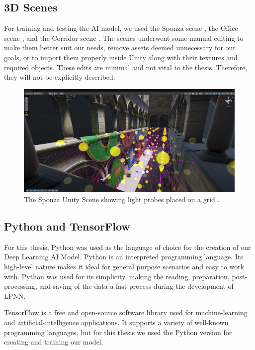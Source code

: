 \subsection{3D Scenes}
For training and testing the AI model, we used the Sponza scene \parencite{Sponza2017}, the Office scene \parencite{Office2021}, and the Corridor scene \parencite{Corridor2021}. The scenes underwent some manual editing to make them better suit our needs, remove assets deemed unnecessary for our goals, or to import them properly inside Unity along with their textures and required objects. These edits are minimal and not vital to the thesis. Therefore, they will not be explicitly described.

\begin{figure}[h]
	\centering
	\includegraphics[scale=0.294]{Graphics/Sponza_lightprobes.jpg}
	\caption{The Sponza Unity Scene showing light probes placed on a grid \parencite{Sponza2017}.}
	\label{fig:Sponza_lp}
\end{figure}


\subsection{Python and TensorFlow}
For this thesis, Python was used as the language of choice for the creation of our Deep Learning AI Model. Python is an interpreted programming language. Its high-level nature makes it ideal for general purpose scenarios and easy to work with. Python was used for its simplicity, making the reading, preparation, post-processing, and saving of the data a fast process during the development of LPNN.

TensorFlow is a free and open-source software library used for machine-learning and artificial-intelligence applications. It supports a variety of well-known programming languages, but for this thesis we used the Python version for creating and training our model.

